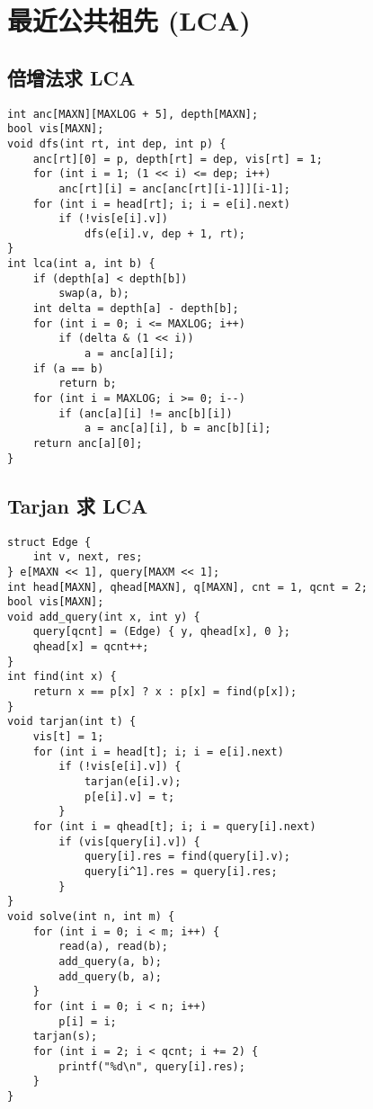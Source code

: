 \section{最近公共祖先 (LCA)}
\subsection{倍增法求 LCA}
\begin{verbatim}
int anc[MAXN][MAXLOG + 5], depth[MAXN];
bool vis[MAXN];
void dfs(int rt, int dep, int p) {
    anc[rt][0] = p, depth[rt] = dep, vis[rt] = 1;
    for (int i = 1; (1 << i) <= dep; i++)
        anc[rt][i] = anc[anc[rt][i-1]][i-1];
    for (int i = head[rt]; i; i = e[i].next)
        if (!vis[e[i].v])
            dfs(e[i].v, dep + 1, rt);
}
int lca(int a, int b) {
    if (depth[a] < depth[b])
        swap(a, b);
    int delta = depth[a] - depth[b];
    for (int i = 0; i <= MAXLOG; i++)
        if (delta & (1 << i))
            a = anc[a][i];
    if (a == b)
        return b;
    for (int i = MAXLOG; i >= 0; i--)
        if (anc[a][i] != anc[b][i])
            a = anc[a][i], b = anc[b][i];
    return anc[a][0];
}
\end{verbatim}

\subsection{Tarjan 求 LCA}
\begin{verbatim}
struct Edge {
    int v, next, res;
} e[MAXN << 1], query[MAXM << 1];
int head[MAXN], qhead[MAXN], q[MAXN], cnt = 1, qcnt = 2;
bool vis[MAXN];
void add_query(int x, int y) {
    query[qcnt] = (Edge) { y, qhead[x], 0 };
    qhead[x] = qcnt++;
}
int find(int x) {
    return x == p[x] ? x : p[x] = find(p[x]);
}
void tarjan(int t) {
    vis[t] = 1;
    for (int i = head[t]; i; i = e[i].next)
        if (!vis[e[i].v]) {
            tarjan(e[i].v);
            p[e[i].v] = t;
        }
    for (int i = qhead[t]; i; i = query[i].next)
        if (vis[query[i].v]) {
            query[i].res = find(query[i].v);
            query[i^1].res = query[i].res;
        }
}
void solve(int n, int m) {
    for (int i = 0; i < m; i++) {
        read(a), read(b);
        add_query(a, b);
        add_query(b, a);
    }
    for (int i = 0; i < n; i++)
        p[i] = i;
    tarjan(s);
    for (int i = 2; i < qcnt; i += 2) {
        printf("%d\n", query[i].res);
    }
}
\end{verbatim}

